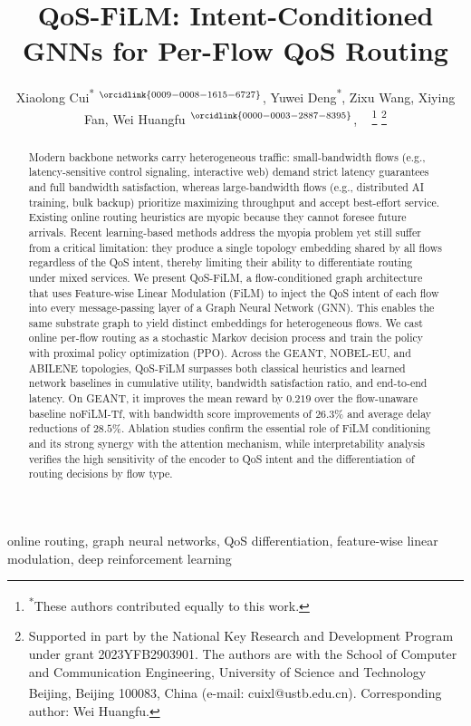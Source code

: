 \documentclass[lettersize,journal]{IEEEtran}
\title{QoS-FiLM: Intent-Conditioned GNNs for Per-Flow QoS Routing}
\author{Xiaolong Cui\textsuperscript{*}\hspace{-1.5mm}$^{~\orcidlink{0009-0008-1615-6727}}$, Yuwei Deng\textsuperscript{*}, Zixu Wang, Xiying Fan, Wei Huangfu\textsuperscript{\textdagger}\hspace{-1.5mm}$^{~\orcidlink{0000-0003-2887-8395}}$, ~\IEEEmembership{Senior Member,~IEEE}
\thanks{\textsuperscript{*}These authors contributed equally to this work.}
\thanks{Supported in part by the National Key Research and Development Program under grant 2023YFB2903901.
The authors are with the School of Computer and Communication Engineering, University of Science and Technology Beijing, Beijing 100083, China (e-mail: cuixl@ustb.edu.cn). 
\textsuperscript{\textdagger}Corresponding author: Wei Huangfu.}
}
\begin{document}
\maketitle

\begin{abstract}
Modern backbone networks carry heterogeneous traffic: small-bandwidth flows (e.g., latency-sensitive control signaling, interactive web) demand strict latency guarantees and full bandwidth satisfaction, whereas large-bandwidth flows (e.g., distributed AI training, bulk backup) prioritize maximizing throughput and accept best-effort service. Existing online routing heuristics are myopic because they cannot foresee future arrivals. Recent learning-based methods address the myopia problem yet still suffer from a critical limitation: they produce a single topology embedding shared by all flows regardless of the QoS intent, thereby limiting their ability to differentiate routing under mixed services. We present QoS-FiLM, a flow-conditioned graph architecture that uses Feature-wise Linear Modulation (FiLM) to inject the QoS intent of each flow into every message-passing layer of a Graph Neural Network (GNN). This enables the same substrate graph to yield distinct embeddings for heterogeneous flows. We cast online per-flow routing as a stochastic Markov decision process and train the policy with proximal policy optimization (PPO). Across the GEANT, NOBEL-EU, and ABILENE topologies, QoS-FiLM surpasses both classical heuristics and learned network baselines in cumulative utility, bandwidth satisfaction ratio, and end-to-end latency. On GEANT, it improves the mean reward by $0.219$ over the flow-unaware baseline noFiLM-Tf, with bandwidth score improvements of $26.3\%$ and average delay reductions of $28.5\%$. Ablation studies confirm the essential role of FiLM conditioning and its strong synergy with the attention mechanism, while interpretability analysis verifies the high sensitivity of the encoder to QoS intent and the differentiation of routing decisions by flow type.
\end{abstract}

\begin{IEEEkeywords}
online routing, graph neural networks, QoS differentiation, feature-wise linear modulation, deep reinforcement learning
\end{IEEEkeywords}










\end{document}
